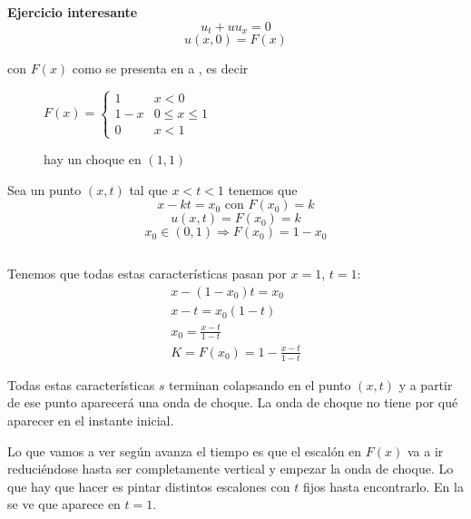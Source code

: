 		\newpage %

		\textbf{Ejercicio interesante}
			$$u_t + uu_x = 0$$
			$$u(x,0) = F(x) $$

			con $F(x)$ como se presenta en a , es decir
			\begin{figure}[hbtp]
			\begin{minipage}{0.45\textwidth}
				\centering
				\caption{ }
				\label{fig:ejer-feb-2-F}
			\end{minipage}
			\begin{minipage}{0.45\textwidth}
				$ F(x) = \begin{cases}
					1   & x < 0\\
					1-x & 0 \leq x \leq 1\\
					0   & x < 1
				\end{cases}
				$
			\end{minipage}
			\end{figure}

			\begin{wrapfigure}{l}{0.45\textwidth}
				\vspace{-15pt}
				\caption{hay un choque en $(1,1)$}
				\label{fig:ejer-feb-2-XT} %
				\vspace{15pt}
			\end{wrapfigure}

			Sea un punto $(x,t)$ tal que $x<t<1$ tenemos que
			$$x - kt = x_0 \text{ con } F(x_0) = k $$
			$$u(x,t) = F(x_0) = k$$
			$$x_0 \in (0,1) \Rightarrow F(x_0) = 1 - x_0$$

			$ $ %

			Tenemos que todas estas características pasan por $x = 1$, $t = 1$:
			\begin{gather*}
				x - (1-x_0) t = x_0 \\
				x-t = x_0 (1-t) \\
				x_0 = \frac{x-t}{1-t} \\
				K = F(x_0) = 1 - \frac{x-t}{1-t}
			\end{gather*}

			Todas estas características $s$ terminan colapsando en el punto $(x,t)$ y a partir de ese punto aparecerá una onda de choque. La onda de choque no tiene por qué aparecer en el instante inicial.

			Lo que vamos a ver según avanza el tiempo es que el escalón en $F(x)$ va a ir reduciéndose hasta ser completamente vertical y empezar la onda de choque. Lo que hay que hacer es pintar distintos escalones con $t$ fijos hasta encontrarlo. En la  se ve que aparece en $t=1$.

